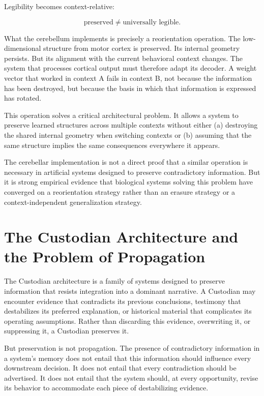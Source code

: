 \documentclass[12pt]{article}
\begin{document}
Legibility becomes context-relative:

\begin{equation}
\text{preserved} \neq \text{universally legible}.
\end{equation}

What the cerebellum implements is precisely a reorientation operation. The low-dimensional structure from motor cortex is preserved. Its internal geometry persists. But its alignment with the current behavioral context changes. The system that processes cortical output must therefore adapt its decoder. A weight vector that worked in context A fails in context B, not because the information has been destroyed, but because the basis in which that information is expressed has rotated.

This operation solves a critical architectural problem. It allows a system to preserve learned structures across multiple contexts without either (a) destroying the shared internal geometry when switching contexts or (b) assuming that the same structure implies the same consequences everywhere it appears.

The cerebellar implementation is not a direct proof that a similar operation is necessary in artificial systems designed to preserve contradictory information. But it is strong empirical evidence that biological systems solving this problem have converged on a reorientation strategy rather than an erasure strategy or a context-independent generalization strategy.

\section{The Custodian Architecture and the Problem of Propagation}

The Custodian architecture is a family of systems designed to preserve information that resists integration into a dominant narrative. A Custodian may encounter evidence that contradicts its previous conclusions, testimony that destabilizes its preferred explanation, or historical material that complicates its operating assumptions. Rather than discarding this evidence, overwriting it, or suppressing it, a Custodian preserves it.

But preservation is not propagation. The presence of contradictory information in a system's memory does not entail that this information should influence every downstream decision. It does not entail that every contradiction should be advertised. It does not entail that the system should, at every opportunity, revise its behavior to accommodate each piece of destabilizing evidence.
\end{document}
